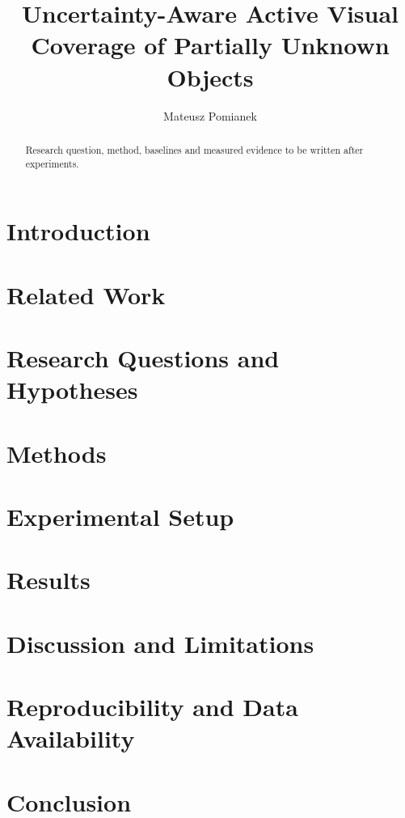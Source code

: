 \documentclass[11pt,a4paper]{article}
\title{Uncertainty-Aware Active Visual Coverage of Partially Unknown Objects}
\author{Mateusz Pomianek}
\date{}
\begin{document}
\maketitle
\begin{abstract}
Research question, method, baselines and measured evidence to be written after experiments.
\end{abstract}
\section{Introduction}
\section{Related Work}
\section{Research Questions and Hypotheses}
\section{Methods}
\section{Experimental Setup}
\section{Results}
\section{Discussion and Limitations}
\section{Reproducibility and Data Availability}
\section{Conclusion}
\end{document}
